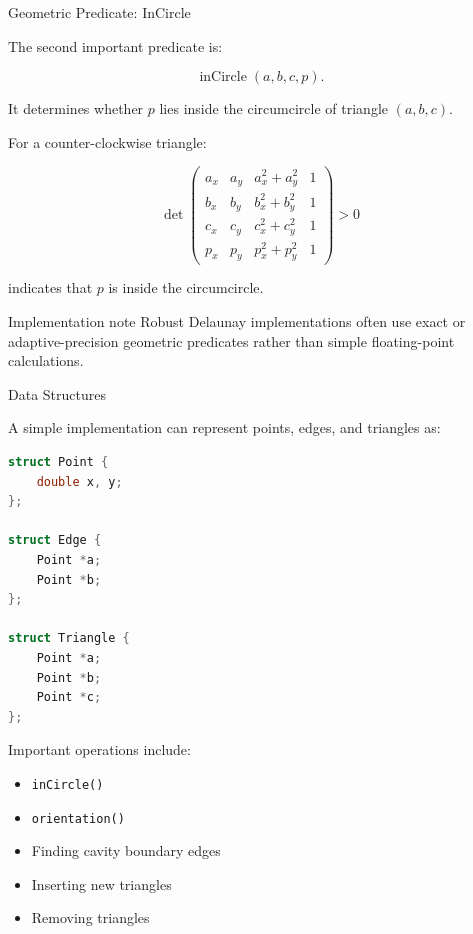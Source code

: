 \documentclass[aspectratio=169]{beamer}
\begin{document}
\begin{frame}{Geometric Predicate: InCircle}

The second important predicate is:

\[
\operatorname{inCircle}(a,b,c,p).
\]

It determines whether $p$ lies inside the circumcircle of
triangle $(a,b,c)$.

For a counter-clockwise triangle:

\[
\det
\begin{pmatrix}
a_x & a_y & a_x^2+a_y^2 & 1\\
b_x & b_y & b_x^2+b_y^2 & 1\\
c_x & c_y & c_x^2+c_y^2 & 1\\
p_x & p_y & p_x^2+p_y^2 & 1
\end{pmatrix}
>0
\]

indicates that $p$ is inside the circumcircle.

\vspace{0.2cm}

\begin{block}{Implementation note}
Robust Delaunay implementations often use exact or adaptive-precision
geometric predicates rather than simple floating-point calculations.
\end{block}

\end{frame}

\begin{frame}[fragile]{Data Structures}

A simple implementation can represent points, edges, and triangles as:

\begin{lstlisting}[language=C++,basicstyle=\ttfamily\small]
struct Point {
    double x, y;
};

struct Edge {
    Point *a;
    Point *b;
};

struct Triangle {
    Point *a;
    Point *b;
    Point *c;
};
\end{lstlisting}

Important operations include:

\begin{itemize}
    \item \texttt{inCircle()}
    \item \texttt{orientation()}
    \item Finding cavity boundary edges
    \item Inserting new triangles
    \item Removing triangles
\end{itemize}

\end{frame}
\end{document}
